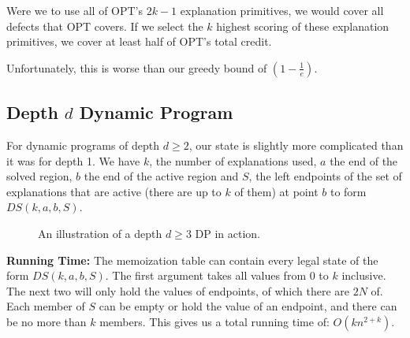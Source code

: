 \documentclass[11pt,twocolumn]{article}
\begin{document}
Were we to use all of OPT's $2k-1$ explanation primitives, we would cover all defects that OPT covers.  If we select the $k$ highest scoring of these explanation primitives, we cover at least half of OPT's total credit.

Unfortunately, this is worse than our greedy bound of $(1- \frac{1}{e})$.

\subsection{Depth $d$ Dynamic Program} \label{sec:dpFixedDepth}

For dynamic programs of depth $d \geq 2$, our state is slightly more complicated than it was for depth 1. We have $k$, the number of explanations used, $a$ the end of the solved region, $b$ the end of the active region and $S$, the left endpoints of the set of explanations that are active (there are up to $k$ of them) at point $b$ to form $DS(k,a,b,S)$.


\begin{figure}[h!]
\caption{An illustration of a depth $d \geq 3$ DP in action.}
\label{fig:dpIllustration}
\end{figure}

\FloatBarrier

{\bf Running Time:} The memoization table can contain every legal state of the form $DS(k,a,b,S)$.  The first argument takes all values from 0 to $k$ inclusive.  The next two will only hold the values of endpoints, of which there are $2N$ of.  Each member of $S$ can be empty or hold the value of an endpoint, and there can be no more than $k$ members.  This gives us a total running time of: $O(kn^{2+k})$.
\end{document}
